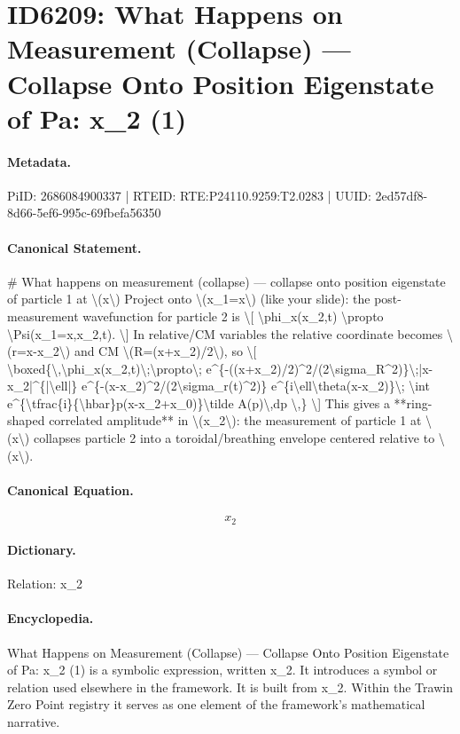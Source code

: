 \section*{ID6209: What Happens on Measurement (Collapse) — Collapse Onto Position Eigenstate of Pa: x\_2 (1)}
\paragraph{Metadata.}
PiID: 2686084900337 | RTEID: RTE:P24110.9259:T2.0283 | UUID: 2ed57df8-8d66-5ef6-995c-69fbefa56350

\paragraph{Canonical Statement.}
\# What happens on measurement (collapse) — collapse onto position eigenstate of particle 1 at \textbackslash{}(x\textbackslash{}) Project onto \textbackslash{}(x\_1=x\textbackslash{}) (like your slide): the post-measurement wavefunction for particle 2 is \textbackslash{}[ \textbackslash{}phi\_x(x\_2,t) \textbackslash{}propto \textbackslash{}Psi(x\_1=x,x\_2,t). \textbackslash{}] In relative/CM variables the relative coordinate becomes \textbackslash{}(r=x-x\_2\textbackslash{}) and CM \textbackslash{}(R=(x+x\_2)/2\textbackslash{}), so \textbackslash{}[ \textbackslash{}boxed\{\textbackslash{},\textbackslash{}phi\_x(x\_2,t)\textbackslash{};\textbackslash{}propto\textbackslash{}; e\textasciicircum{}\{-((x+x\_2)/2)\textasciicircum{}2/(2\textbackslash{}sigma\_R\textasciicircum{}2)\}\textbackslash{};|x-x\_2|\textasciicircum{}\{|\textbackslash{}ell|\} e\textasciicircum{}\{-(x-x\_2)\textasciicircum{}2/(2\textbackslash{}sigma\_r(t)\textasciicircum{}2)\} e\textasciicircum{}\{i\textbackslash{}ell\textbackslash{}theta(x-x\_2)\}\textbackslash{}; \textbackslash{}int e\textasciicircum{}\{\textbackslash{}tfrac\{i\}\{\textbackslash{}hbar\}p(x-x\_2+x\_0)\}\textbackslash{}tilde A(p)\textbackslash{},dp \textbackslash{},\} \textbackslash{}] This gives a **ring-shaped correlated amplitude** in \textbackslash{}(x\_2\textbackslash{}): the measurement of particle 1 at \textbackslash{}(x\textbackslash{}) collapses particle 2 into a toroidal/breathing envelope centered relative to \textbackslash{}(x\textbackslash{}).

\paragraph{Canonical Equation.}
\[
x_2
\]

\paragraph{Dictionary.}
Relation: x\_2

\paragraph{Encyclopedia.}
What Happens on Measurement (Collapse) — Collapse Onto Position Eigenstate of Pa: x\_2 (1) is a symbolic expression, written x\_2. It introduces a symbol or relation used elsewhere in the framework. It is built from x\_2. Within the Trawin Zero Point registry it serves as one element of the framework's mathematical narrative.
